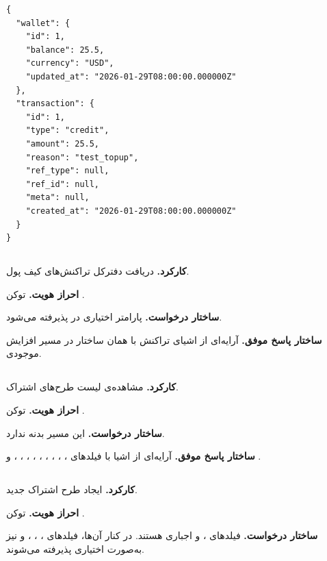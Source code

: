 \begin{latin}
\begin{lstlisting}[style=jsonStyle]
{
  "wallet": {
    "id": 1,
    "balance": 25.5,
    "currency": "USD",
    "updated_at": "2026-01-29T08:00:00.000000Z"
  },
  "transaction": {
    "id": 1,
    "type": "credit",
    "amount": 25.5,
    "reason": "test_topup",
    "ref_type": null,
    "ref_id": null,
    "meta": null,
    "created_at": "2026-01-29T08:00:00.000000Z"
  }
}
\end{lstlisting}
\end{latin}


\subsection{}
\textbf{کارکرد.} دریافت دفترکل تراکنش‌های کیف پول.

\textbf{احراز هویت.} توکن .

\textbf{ساختار درخواست.} پارامتر اختیاری  در 
پذیرفته می‌شود.

\textbf{ساختار پاسخ موفق.} آرایه‌ای از اشیای تراکنش با همان ساختار
 در مسیر افزایش موجودی.

\subsection{}
\textbf{کارکرد.} مشاهده‌ی لیست طرح‌های اشتراک.

\textbf{احراز هویت.} توکن .

\textbf{ساختار درخواست.} این مسیر بدنه ندارد.

\textbf{ساختار پاسخ موفق.} آرایه‌ای از اشیا با فیلدهای ،
، ، ، ،
، ، ،
،  و .

\subsection{}
\textbf{کارکرد.} ایجاد طرح اشتراک جدید.

\textbf{احراز هویت.} توکن .

\textbf{ساختار درخواست.} فیلدهای ،  و
 اجباری هستند. در کنار آن‌ها، فیلدهای ،
، ،  و
 نیز به‌صورت اختیاری پذیرفته می‌شوند.

